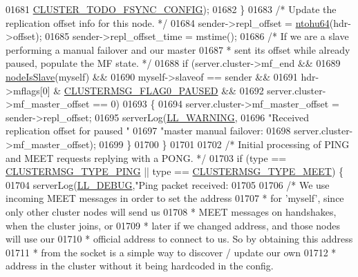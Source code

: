\begin{DoxyCode}
{{{{{{{{{{{{{{{{{{{{{{{01681                                  \hyperlink{cluster_8h_accc9a00230cd04789db2398bb3ab715a}{CLUSTER\_TODO\_FSYNC\_CONFIG});
01682         \}
01683         \textcolor{comment}{/* Update the replication offset info for this node. */}
01684         sender->repl\_offset = \hyperlink{endianconv_8h_ab6e7416a2faac85cd6d50180e7348a1b}{ntohu64}(hdr->offset);
01685         sender->repl\_offset\_time = mstime();
01686         \textcolor{comment}{/* If we are a slave performing a manual failover and our master}
01687 \textcolor{comment}{         * sent its offset while already paused, populate the MF state. */}
01688         \textcolor{keywordflow}{if} (server.cluster->mf\_end &&
01689             \hyperlink{cluster_8h_a3c99881f6892130c902b42b1f84a0e11}{nodeIsSlave}(myself) &&
01690             myself->slaveof == sender &&
01691             hdr->mflags[0] & \hyperlink{cluster_8h_aa7da3a662e6241de4f004fa1a4519cf2}{CLUSTERMSG\_FLAG0\_PAUSED} &&
01692             server.cluster->mf\_master\_offset == 0)
01693         \{
01694             server.cluster->mf\_master\_offset = sender->repl\_offset;
01695             serverLog(\hyperlink{server_8h_a31229b9334bba7d6be2a72970967a14b}{LL\_WARNING},
01696                 \textcolor{stringliteral}{"Received replication offset for paused "}
01697                 \textcolor{stringliteral}{"master manual failover: %
01698                 server.cluster->mf\_master\_offset);
01699         \}
01700     \}
01701 
01702     \textcolor{comment}{/* Initial processing of PING and MEET requests replying with a PONG. */}
01703     \textcolor{keywordflow}{if} (type == \hyperlink{cluster_8h_aeb8a936505e22f64e5039523a3c96d4c}{CLUSTERMSG\_TYPE\_PING} || type == 
      \hyperlink{cluster_8h_aaf264f57ae1869c57093fd9fbc6fc5bc}{CLUSTERMSG\_TYPE\_MEET}) \{
01704         serverLog(\hyperlink{server_8h_abcaffe365dee628fcf9fc90c69d534a1}{LL\_DEBUG},\textcolor{stringliteral}{"Ping packet received: %
01705 
01706         \textcolor{comment}{/* We use incoming MEET messages in order to set the address}
01707 \textcolor{comment}{         * for 'myself', since only other cluster nodes will send us}
01708 \textcolor{comment}{         * MEET messages on handshakes, when the cluster joins, or}
01709 \textcolor{comment}{         * later if we changed address, and those nodes will use our}
01710 \textcolor{comment}{         * official address to connect to us. So by obtaining this address}
01711 \textcolor{comment}{         * from the socket is a simple way to discover / update our own}
01712 \textcolor{comment}{         * address in the cluster without it being hardcoded in the config.}
}}}}}}}}}}}}}}}}}}}}}}}}}
\end{DoxyCode}
